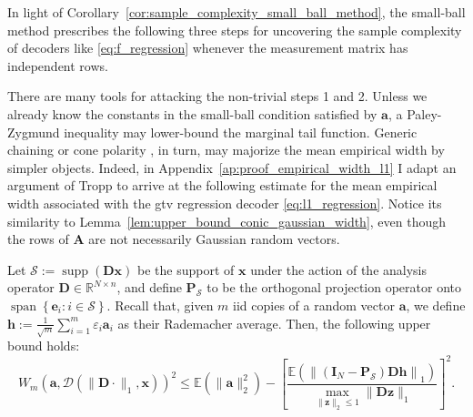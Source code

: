 In light of Corollary~\ref{cor:sample_complexity_small_ball_method}, the small-ball method prescribes the following three steps for uncovering the sample complexity of decoders like \eqref{eq:f_regression} whenever the measurement matrix has independent rows.
\begin{algorithm}
    \begin{algorithmic}[1]
    \end{algorithmic}
\end{algorithm}

There are many tools for attacking the non-trivial steps 1 and 2. Unless we already know the constants in the small-ball condition satisfied by $\mathbf{a}$, a Paley-Zygmund inequality \cite[Prop. 3.3.1]{delapena1999} may lower-bound the marginal tail function. Generic chaining \cite[Ch. 2]{talagrand2014} or cone polarity \cite[Prop 7.1]{tropp2015a}, in turn, may majorize the mean empirical width by simpler objects. Indeed, in Appendix~\ref{ap:proof_empirical_width_l1} I adapt an argument of Tropp to arrive at the following estimate for the mean empirical width associated with the \acrshort{gtv} regression decoder \eqref{eq:l1_regression}. Notice its similarity to Lemma~\ref{lem:upper_bound_conic_gaussian_width}, even though the rows of $\mathbf{A}$ are not necessarily Gaussian random vectors.

\begin{lemma}\label{lem:upper_bound_mean empirical_width}
    Let $\mathcal{S} := \operatorname{supp}\left ( \mathbf{Dx} \right )$ be the support of $\mathbf{x}$ under the action of the analysis operator $\mathbf{D} \in \mathbb{R}^{N \times n}$, and define $\mathbf{P}_\mathcal{S}$ to be the orthogonal projection operator onto $\operatorname{span}\left \{ \mathbf{e}_i : i \in \mathcal{S} \right \}$. Recall that, given $m$ \acrshort{iid} copies of a random vector $\mathbf{a}$, we define $\mathbf{h} := \frac{1}{\sqrt{m}} \sum_{i=1}^{m} \varepsilon_i \mathbf{a}_i$ as their Rademacher average. Then, the following upper bound holds:
    \begin{equation}
        W_{m}(\mathbf{a}, \mathcal{D}( \|\mathbf{D} \cdot \|_1, \mathbf{x}))^2 \leq \mathbb{E} \left ( \|\mathbf{a}\|_2^2 \right ) - \left [ \frac{\mathbb{E} \left ( \left \|(\mathbf{I}_N - \mathbf{P}_\mathcal{S}) \mathbf{Dh} \right \|_1 \right )}{\underset{\|\mathbf{z}\|_2 \leq 1}{\max} \| \mathbf{Dz} \|_1} \right ]^2.
        \label{eq:upper_bound_mean empirical_width}
    \end{equation}
\end{lemma}

